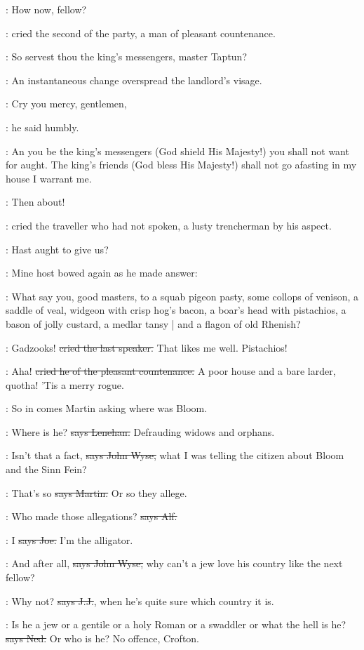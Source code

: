 \power:
How now,
fellow?

:
cried the second of the party,
a man of pleasant countenance.

\power:
So servest thou the king's messengers,
master Taptun?

:
An instantaneous change overspread the landlord's visage.

\terry:
Cry you mercy,
gentlemen,

:
he said humbly.

\terry:
An you be the king's messengers
(God shield His Majesty!)
you shall not want for aught.
The king's friends
(God bless His Majesty!)
shall not go afasting in my house I warrant me.

\crofton:
Then about!

:
cried the traveller who had not spoken,
a lusty trencherman by his aspect.

\crofton:
Hast aught to give us?

:
Mine host bowed again as he made answer:

\terry:
What say you,
good masters,
to a squab pigeon pasty,
some collops of venison,
a saddle of veal,
widgeon with crisp hog's bacon,
a boar's head with pistachios,
a bason of jolly custard,
a medlar tansy |
and a flagon of old Rhenish?

\crofton:
Gadzooks!
\sout{cried the last speaker.}
That likes me well.
Pistachios!

\power:
Aha!
\sout{cried he of the pleasant countenance.}
A poor house and a bare larder,
quotha!
'Tis a merry rogue.

\Nq:
So in comes Martin asking where was Bloom.

\lenehan:
Where is he?
\sout{says Lenehan.}
Defrauding widows and orphans.

\johnwyse:
Isn't that a fact,
\sout{says John Wyse,}
what I was telling the citizen about
Bloom and the Sinn Fein?

\cunningham:
That's so
\sout{says Martin.}
Or so they allege.

\bergan:
Who made those allegations?
\sout{says Alf.}

\joe:
I
\sout{says Joe.}
I'm the alligator.

\johnwyse:
And after all,
\sout{says John Wyse,}
why can't a jew love his country
like the next fellow?

\jjom:
Why not?
\sout{says J.J.},
when he's quite sure which country it is.

\lambert:
Is he a jew or a gentile or a holy Roman
or a swaddler or what the hell is he?
\sout{says Ned.}
Or who is he?
No offence,
Crofton.

